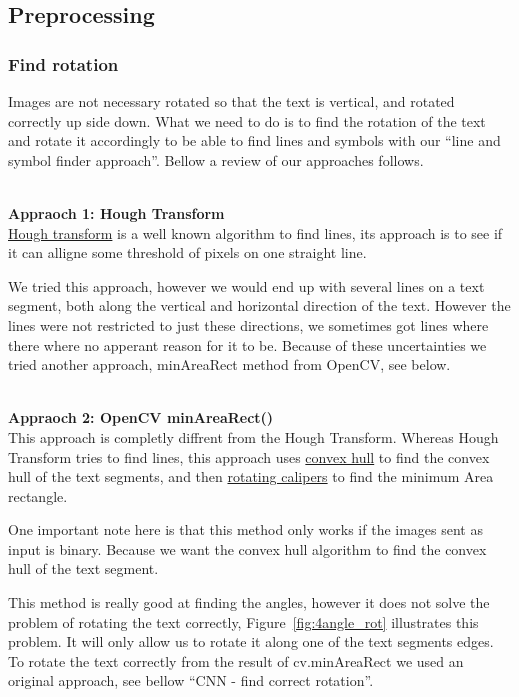 \documentclass[11pt,a4paper,UKenglish]{article}
\begin{document}
\subsection{Preprocessing}
\subsubsection{Find rotation}
Images are not necessary rotated so that the text is vertical, and rotated
correctly up side down. What we need to do is to find the rotation of the text
and rotate it accordingly to be able to find lines and symbols with our
``line and symbol finder approach''. Bellow a review of our approaches follows.

\noindent \\ \textbf{Appraoch 1: Hough Transform}
\noindent \\ \href{https://en.wikipedia.org/wiki/Hough_transform}{Hough transform} is a well known algorithm to find lines, its
approach is to see if it can alligne some threshold of pixels on one straight
line. \par
We tried this approach, however we would end up with several lines on a text
segment, both along the vertical and horizontal direction of the text. However
the lines were not restricted to just these directions, we sometimes got lines
where there where no apperant reason for it to be. Because of these
uncertainties we tried another approach, minAreaRect method from OpenCV, see
below.

\noindent \\ \textbf{Appraoch 2: OpenCV minAreaRect()}
\noindent \\ This approach is completly diffrent from the Hough Transform.
Whereas Hough Transform tries to find lines, this approach uses
\href{https://en.wikipedia.org/wiki/Convex_hull}{convex hull} to find the
convex hull of the text segments, and then
\href{https://en.wikipedia.org/wiki/Rotating_calipers}{rotating calipers} to
find the minimum Area rectangle. \par
One important note here is that this method only works if the images sent as
input is binary. Because we want the convex hull algorithm to find the convex
hull of the text segment. \par
This method is really good at finding the angles, however it does not solve the
problem of rotating the text correctly, Figure~\ref{fig:4angle_rot} illustrates
this problem. It will only allow us to rotate it along one of the text
segments edges. To rotate the text correctly from the result of cv.minAreaRect
we used an original approach, see bellow ``CNN - find correct rotation''.
\end{document}

